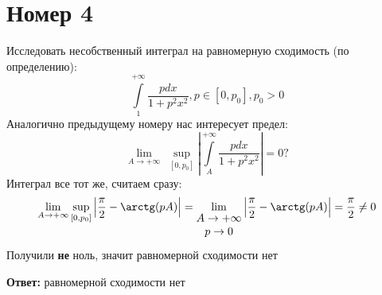 \documentclass[a4paper,12pt]{article}
\begin{document}
\section*{Номер 4}
Исследовать несобственный интеграл на равномерную сходимость (по определению):
\[
\int\limits_1^{+\infty} \frac{pdx}{1 + p^2x^2}, p \in [0, p_0], p_0 > 0
\]
Аналогично предыдущему номеру нас интересует предел:
\[
\lim_{A \rightarrow + \infty} \; \underset{[0, p_0]}{\sup} \left|
\int\limits_A^{+\infty}  \frac{pdx}{1 + p^2x^2}
 \right| = 0?
\]
Интеграл все тот же, считаем сразу:
\[
\lim_{A \rightarrow +\infty}
\underset{[0, p_0]}{\sup} \left|
 \frac{\pi}{2} - \arctg(pA) \right| =
 \lim_{
\begin{matrix}
A \rightarrow +\infty \\
p \rightarrow 0
\end{matrix}} \left|
 \frac{\pi}{2} - \arctg(pA) \right| =
\frac{\pi}{2} \neq 0
\]
Получили \textbf{не} ноль, значит равномерной сходимости нет
\begin{center}
\textbf{Ответ: } равномерной сходимости нет
\end{center}
\end{document}
